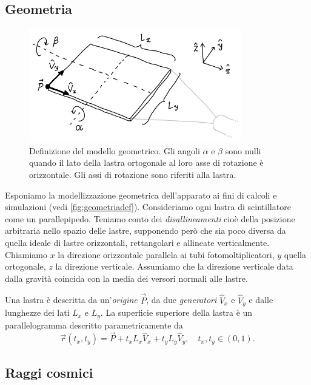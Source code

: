 \subsection{Geometria}
\label{sec:teogeom}

\begin{figure}
	\center
	\includegraphics[width=25em]{geometriadef}
	\caption{\label{fig:geometriadef}
	Definizione del modello geometrico.
	Gli angoli $\alpha$ e $\beta$ sono nulli
	quando il lato della lastra ortogonale al loro asse di rotazione è orizzontale.
	Gli assi di rotazione sono riferiti alla lastra.}
\end{figure}

Esponiamo la modellizzazione geometrica dell'apparato ai fini di calcoli e simulazioni
(vedi \autoref{fig:geometriadef}).
Consideriamo ogni lastra di scintillatore come un parallepipedo.
Teniamo conto dei \emph{disallineamenti} cioè della posizione arbitraria nello spazio delle lastre,
supponendo però che sia poco diversa da quella ideale di lastre orizzontali, rettangolari e allineate verticalmente.
Chiamiamo $x$ la direzione orizzontale parallela ai tubi fotomoltiplicatori,
$y$ quella ortogonale,
$z$ la direzione verticale.
Assumiamo che la direzione verticale data dalla gravità
coincida con la media dei versori normali alle lastre.

Una lastra è descritta da un'\emph{origine} $\vec P$,
da due \emph{generatori} $\hat V_x$ e $\hat V_y$
e dalle lunghezze dei lati $L_x$ e $L_y$.
La superficie superiore della lastra è un parallelogramma descritto parametricamente da
\begin{equation}
	\label{eq:lastra}
	\vec r(t_x, t_y) = \vec P + t_x L_x \hat V_x + t_y L_y \hat V_y,
	\quad t_x,t_y \in (0,1).
\end{equation}

\subsection{Raggi cosmici}

